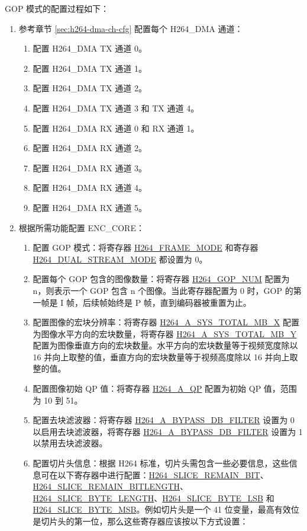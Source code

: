 \documentclass[main\_\_CN.tex]{subfiles}
\begin{document}
GOP 模式的配置过程如下：
\begin{enumerate}
    \item 参考章节 \ref{sec:h264-dma-ch-cfg} 配置每个 H264\_DMA 通道：
    \begin{enumerate}
        \item 配置 H264\_DMA TX 通道 0。
        \item 配置 H264\_DMA TX 通道 1。
        \item 配置 H264\_DMA TX 通道 2。
        \item 配置 H264\_DMA TX 通道 3 和 TX 通道 4。
        \item 配置 H264\_DMA RX 通道 0 和 RX 通道 1。
        \item 配置 H264\_DMA RX 通道 2。
        \item 配置 H264\_DMA RX 通道 3。
        \item 配置 H264\_DMA RX 通道 4。
        \item 配置 H264\_DMA RX 通道 5。
    \end{enumerate}
    \item\label{item:h264-gop-cfg} 根据所需功能配置 ENC\_CORE：
    \begin{enumerate}
        \item 配置 GOP 模式：将寄存器 \hyperref[fielddesc:H264FRAMEMODE]{H264\_FRAME\_MODE} 和寄存器 \hyperref[fielddesc:H264DUALSTREAMMODE]{H264\_DUAL\_STREAM\_MODE} 都设置为 0。
        \item 配置每个 GOP 包含的图像数量：将寄存器 \hyperref[fielddesc:H264GOPNUM]{H264\_GOP\_NUM} 配置为 n，则表示一个 GOP 包含 n 个图像。当此寄存器配置为 0 时，GOP 的第一帧是 I 帧，后续帧始终是 P 帧，直到编码器被重置为止。
        \item 配置图像的宏块分辨率：将寄存器 \hyperref[fielddesc:H264ASYSTOTALMBX]{H264\_A\_SYS\_TOTAL\_MB\_X} 配置为图像水平方向的宏块数量，将寄存器 \hyperref[fielddesc:H264ASYSTOTALMBY]{H264\_A\_SYS\_TOTAL\_MB\_Y} 配置为图像垂直方向的宏块数量。水平方向的宏块数量等于视频宽度除以 16 并向上取整的值，垂直方向的宏块数量等于视频高度除以 16 并向上取整的值。
        \item 配置图像初始 QP 值：将寄存器 \hyperref[fielddesc:H264AQP]{H264\_A\_QP} 配置为初始 QP 值，范围为 10 到 51。
        \item 配置去块滤波器：将寄存器 \hyperref[fielddesc:H264ABYPASSDBFILTER]{H264\_A\_BYPASS\_DB\_FILTER} 设置为 0 以启用去块滤波器，将寄存器 \hyperref[fielddesc:H264ABYPASSDBFILTER]{H264\_A\_BYPASS\_DB\_FILTER} 设置为 1 以禁用去块滤波器。
        \item 配置切片头信息：根据 H264 标准，切片头需包含一些必要信息，这些信息可在以下寄存器中进行配置：\hyperref[fielddesc:H264SLICEREMAINBIT]{H264\_SLICE\_REMAIN\_BIT}、\hyperref[fielddesc:H264SLICEREMAINBITLENGTH]{H264\_SLICE\_REMAIN\_BITLENGTH}、\hyperref[fielddesc:H264SLICEBYTELENGTH]{H264\_SLICE\_BYTE\_LENGTH}、\hyperref[fielddesc:H264SLICEBYTELSB]{H264\_SLICE\_BYTE\_LSB} 和 \hyperref[fielddesc:H264SLICEBYTEMSB]{H264\_SLICE\_BYTE\_MSB}。例如切片头是一个 41 位变量，最高有效位是切片头的第一位，那么这些寄存器应该按以下方式设置：

\end{enumerate}
\end{enumerate}
\end{document}
